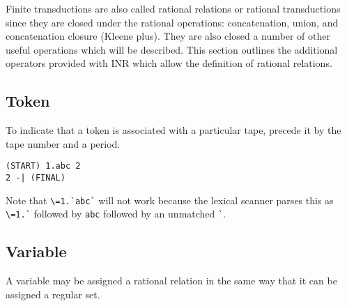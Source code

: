 Finite transductions are also called rational relations or rational
transductions since they are closed under the rational operations:
concatenation, union, and concatenation closure (Kleene plus).
They are also closed a number of other useful operations which will be
described.
This section outlines the additional operators provided with INR which
allow the definition of rational relations.

\subsection{Token}
To indicate that a token is associated with a particular tape, precede it
by the tape number and a period.
\begin{center}\begin{minipage}[t]{3in}\begin{minipage}[t]{3in}\end{minipage}\end{minipage}
\begin{minipage}[t]{1.6in}\begin{verbatim}
(START) 1.abc 2
2 -| (FINAL)
\end{verbatim}\end{minipage}\end{center}
Note that \verb#\=1.`abc`# will not work because the lexical scanner parses
this as \verb#\=1.`# followed by \verb#abc# followed by an unmatched
\verb#`#.

\subsection{Variable}
A variable may be assigned a rational relation in the same way that it can
be assigned a regular set.


